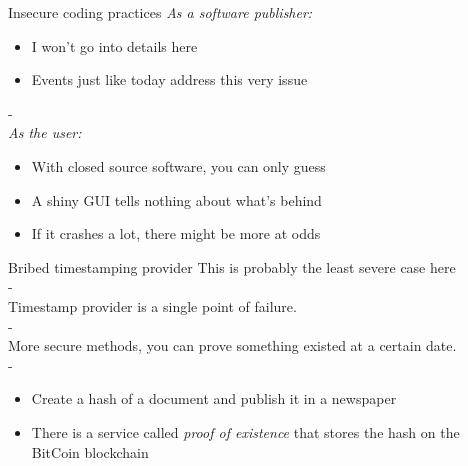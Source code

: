 \documentclass[11pt]{beamer}
\begin{document}
\begin{frame}{Insecure coding practices}
\emph{As a software publisher:}
\begin{itemize}
\item I won't go into details here
\item Events just like today address this very issue
\end{itemize}
-\\
\pause
\emph{As the user:}
\begin{itemize}
\item With closed source software, you can only guess
\item A shiny GUI tells nothing about what's behind
\item If it crashes a lot, there might be more at odds
\end{itemize}
\end{frame}

\begin{frame}{Bribed timestamping provider}
This is probably the least severe case here\\
-\\
Timestamp provider is a single point of failure.\\
-\\
More secure methods, you can prove something existed at a certain date.\\
-\\
\pause
\begin{itemize}
\item Create a hash of a document and publish it in a newspaper
\pause
\item There is a service called \emph{proof of existence} that stores the hash on the BitCoin blockchain
\end{itemize}
\end{frame}
\end{document}
